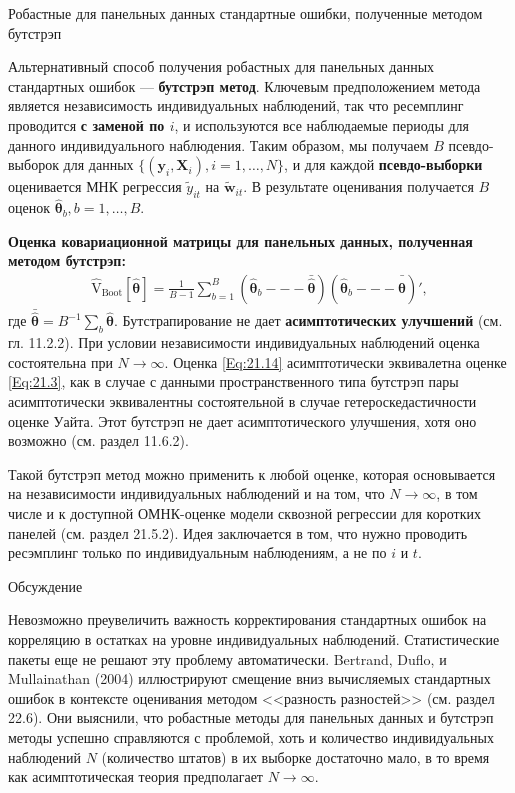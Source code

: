 {\centering
Робастные для панельных данных стандартные ошибки, полученные методом бутстрэп \\}

Альтернативный способ получения робастных для панельных данных стандартных ошибок --- \textbf{бутстрэп метод}. Ключевым предположением метода является независимость индивидуальных наблюдений, так что ресемплинг проводится \textbf{с заменой по $i$}, и используются все наблюдаемые периоды для данного индивидуального наблюдения.
Таким образом, мы получаем $B$ псевдо-выборок для данных $\{(\mathbf y_i, \mathbf X_i), i = 1, \dots, N\}$, и для каждой \textbf{псевдо-выборки} оценивается МНК регрессия $\tilde{y}_{it}$ на $\tilde{\mathbf w}_{it}$. В результате оценивания получается $B$ оценок $\hat{\bm \theta}_b, b=1, \dots, B$.

\textbf{Оценка ковариационной матрицы для панельных данных, полученная методом бутстрэп:}
\begin{align}
\hat{\mathrm V}_{\mathrm {Boot}}[\hat{\bm\theta}]=\frac{1}{B-1} \sum_{b=1}^B \left(\hat{\bm\theta}_b --- \bar{\hat{\bm\theta}} \right) \left( \hat{\bm\theta}_b --- \bar{\hat{\bm\theta}} \right)',
\label{Eq:21.14}
\end{align}
где $\bar{\bm{\hat{\theta}}}=B^{-1} \sum\nolimits_b \bm{\hat{\theta}}$. Бутстрапирование не дает \textbf{асимптотических улучшений} (см. гл. 11.2.2). При условии независимости индивидуальных наблюдений оценка состоятельна при $N \rightarrow \infty$. Оценка \ref{Eq:21.14} асимптотически эквивалетна оценке \ref{Eq:21.3}, как в случае с данными пространственного типа бутстрэп пары асимптотически эквивалентны состоятельной в случае гетероскедастичности оценке Уайта. Этот бутстрэп не дает асимптотического улучшения, хотя оно возможно (см. раздел 11.6.2).

Такой бутстрэп метод  можно применить к любой оценке, которая основывается на независимости индивидуальных наблюдений и на том, что $N \rightarrow \infty$, в том числе и к доступной ОМНК-оценке модели сквозной регрессии для коротких панелей (см. раздел 21.5.2). Идея заключается в том, что нужно проводить ресэмплинг только по индивидуальным наблюдениям, а не по $i$ и $t$.

 
{\centering
Обсуждение\\}

Невозможно преувеличить важность корректирования стандартных ошибок на корреляцию в остатках на уровне индивидуальных наблюдений. Статистические пакеты еще не решают эту проблему автоматически. Bertrand, Duflo, и Mullainathan (2004) иллюстрируют смещение вниз вычисляемых стандартных ошибок в контексте оценивания методом <<разность разностей>> (см. раздел 22.6). Они выяснили, что робастные методы для панельных данных и бутстрэп методы успешно справляются с проблемой, хоть и количество индивидуальных наблюдений $N$ (количество штатов) в их выборке достаточно мало, в то время как асимптотическая теория предполагает $N \rightarrow \infty$.

